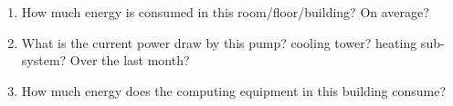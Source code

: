 \begin{enumerate}
\item How much energy is consumed in this room/floor/building?  On average?
\item What is the current power draw by this pump? cooling tower? heating sub-system?  Over
		the last month?
\item How much energy does the computing equipment in this building consume?
\end{enumerate}
\vspace{0.08in}


